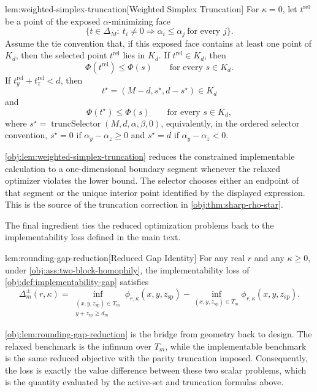\begin{lemmav}{lem:weighted-simplex-truncation}[Weighted Simplex Truncation]
For \(\kappa=0\), let \(t^{\mathrm{rel}}\) be a point of the exposed \(\alpha\)-minimizing face
\[
\{t\in\Delta_M:\ t_i\ne 0\Rightarrow \alpha_i\le \alpha_j\ \text{for every }j\}.
\]
Assume the tie convention that, if this exposed face contains at least one point of \(K_d\), then the selected point \(t^{\mathrm{rel}}\) lies in \(K_d\). If \(t^{\mathrm{rel}}\in K_d\), then
\[
\Phi(t^{\mathrm{rel}})\le \Phi(s)
\qquad\text{for every }s\in K_d.
\]
If \(t^{\mathrm{rel}}_y+t^{\mathrm{rel}}_z<d\), then
\[
t^\star=(M-d,s^\star,d-s^\star)\in K_d
\]
and
\[
\Phi(t^\star)\le \Phi(s)
\qquad\text{for every }s\in K_d,
\]
where \(s^\star=\operatorname{truncSelector}(M,d,\alpha,\beta,0)\), equivalently, in the ordered selector convention, \(s^\star=0\) if \(\alpha_y-\alpha_z\ge 0\) and \(s^\star=d\) if \(\alpha_y-\alpha_z<0\).
\end{lemmav}

\cref{obj:lem:weighted-simplex-truncation} reduces the constrained implementable calculation to a one-dimensional boundary segment whenever the relaxed optimizer violates the lower bound. The selector chooses either an endpoint of that segment or the unique interior point identified by the displayed expression. This is the source of the truncation correction in \cref{obj:thm:sharp-rho-star}.

The final ingredient ties the reduced optimization problems back to the implementability loss defined in the main text.

\begin{lemmav}{lem:rounding-gap-reduction}[Reduced Gap Identity]
For any real $r$ and any $\kappa\ge 0$, under \cref{obj:ass:two-block-homophily}, the implementability loss of \cref{obj:def:implementability-gap} satisfies
\[
\Delta_m^{\pm}(r,\kappa)
=
\inf_{\substack{(x,y,z_{\mathrm{sp}})\in T_m\\ y+z_{\mathrm{sp}}\ge d_m}}
\phi_{r,\kappa}(x,y,z_{\mathrm{sp}})
-
\inf_{(x,y,z_{\mathrm{sp}})\in T_m}
\phi_{r,\kappa}(x,y,z_{\mathrm{sp}}).
\]
\end{lemmav}

\cref{obj:lem:rounding-gap-reduction} is the bridge from geometry back to design. The relaxed benchmark is the infimum over \(T_m\), while the implementable benchmark is the same reduced objective with the parity truncation imposed. Consequently, the loss is exactly the value difference between these two scalar problems, which is the quantity evaluated by the active-set and truncation formulas above.

